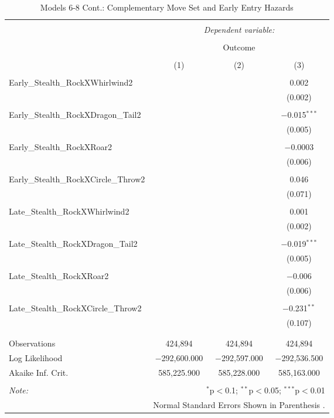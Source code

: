 \documentclass[12pt,twoside]{reedthesis}
\begin{document}
  \begin{table}[!htbp] \centering 
    \caption{Models 6-8 Cont.: Complementary Move Set and Early Entry Hazards} 
    \label{} 
  \begin{tabular}{@{\extracolsep{5pt}}lccc} 
  \\[-1.8ex]\hline 
  \hline \\[-1.8ex] 
   & \multicolumn{3}{c}{\textit{Dependent variable:}} \\ 
  \cline{2-4} 
  \\[-1.8ex] & \multicolumn{3}{c}{Outcome} \\ 
  \\[-1.8ex] & (1) & (2) & (3)\\ 
  \hline \\[-1.8ex] 
   Early\_Stealth\_RockXWhirlwind2 &  &  & 0.002 \\ 
    &  &  & (0.002) \\ 
    & & & \\ 
   Early\_Stealth\_RockXDragon\_Tail2 &  &  & $-$0.015$^{***}$ \\ 
    &  &  & (0.005) \\ 
    & & & \\ 
   Early\_Stealth\_RockXRoar2 &  &  & $-$0.0003 \\ 
    &  &  & (0.006) \\ 
    & & & \\ 
   Early\_Stealth\_RockXCircle\_Throw2 &  &  & 0.046 \\ 
    &  &  & (0.071) \\ 
    & & & \\ 
   Late\_Stealth\_RockXWhirlwind2 &  &  & 0.001 \\ 
    &  &  & (0.002) \\ 
    & & & \\ 
   Late\_Stealth\_RockXDragon\_Tail2 &  &  & $-$0.019$^{***}$ \\ 
    &  &  & (0.005) \\ 
    & & & \\ 
   Late\_Stealth\_RockXRoar2 &  &  & $-$0.006 \\ 
    &  &  & (0.006) \\ 
    & & & \\ 
   Late\_Stealth\_RockXCircle\_Throw2 &  &  & $-$0.231$^{**}$ \\ 
    &  &  & (0.107) \\ 
    & & & \\ 
  \hline \\[-1.8ex] 
  Observations & 424,894 & 424,894 & 424,894 \\ 
  Log Likelihood & $-$292,600.000 & $-$292,597.000 & $-$292,536.500 \\ 
  Akaike Inf. Crit. & 585,225.900 & 585,228.000 & 585,163.000 \\ 
  \hline 
  \hline \\[-1.8ex] 
  \textit{Note:}  & \multicolumn{3}{r}{$^{*}$p$<$0.1; $^{**}$p$<$0.05; $^{***}$p$<$0.01} \\ 
   & \multicolumn{3}{r}{Normal Standard Errors Shown in Parenthesis .} \\ 
  \end{tabular} 
  \end{table}
  
\end{document}
